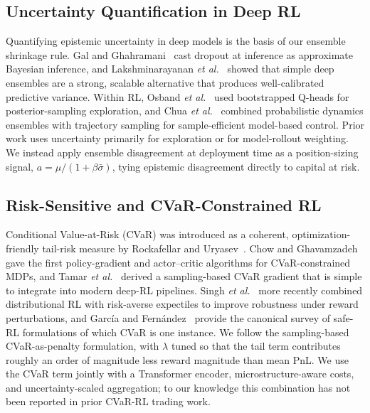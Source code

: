 \documentclass[conference]{IEEEtran}
\begin{document}
\subsection{Uncertainty Quantification in Deep RL}
Quantifying epistemic uncertainty in deep models is the basis of our
ensemble shrinkage rule. Gal and Ghahramani~\cite{gal2016dropout} cast
dropout at inference as approximate Bayesian inference, and
Lakshminarayanan \textit{et al.}~\cite{lakshminarayanan2017ensembles}
showed that simple deep ensembles are a strong, scalable alternative
that produces well-calibrated predictive variance. Within RL, Osband
\textit{et al.}~\cite{osband2016bootstrapped} used bootstrapped Q-heads
for posterior-sampling exploration, and Chua
\textit{et al.}~\cite{chua2018pets} combined probabilistic dynamics
ensembles with trajectory sampling for sample-efficient model-based
control. Prior work uses uncertainty primarily for exploration or for
model-rollout weighting. We instead apply ensemble disagreement at
deployment time as a position-sizing signal,
$a = \mu / (1 + \beta \bar\sigma)$, tying epistemic disagreement
directly to capital at risk.

\subsection{Risk-Sensitive and CVaR-Constrained RL}
Conditional Value-at-Risk (CVaR) was introduced as a coherent,
optimization-friendly tail-risk measure by Rockafellar and
Uryasev~\cite{rockafellar2000cvar}. Chow and
Ghavamzadeh~\cite{chow2014cvar} gave the first policy-gradient and
actor--critic algorithms for CVaR-constrained MDPs, and Tamar
\textit{et al.}~\cite{tamar2015cvar} derived a sampling-based CVaR
gradient that is simple to integrate into modern deep-RL pipelines.
Singh \textit{et al.}~\cite{singh2020risksensitive} more recently
combined distributional RL with risk-averse expectiles to improve
robustness under reward perturbations, and Garc\'ia and
Fern\'andez~\cite{garcia2015saferl} provide the canonical survey of
safe-RL formulations of which CVaR is one instance. We follow the
sampling-based CVaR-as-penalty formulation, with $\lambda$ tuned so
that the tail term contributes roughly an order of magnitude less
reward magnitude than mean PnL. We use the CVaR term jointly with a
Transformer encoder, microstructure-aware costs, and uncertainty-scaled
aggregation; to our knowledge this combination has not been reported
in prior CVaR-RL trading work.


\end{document}
